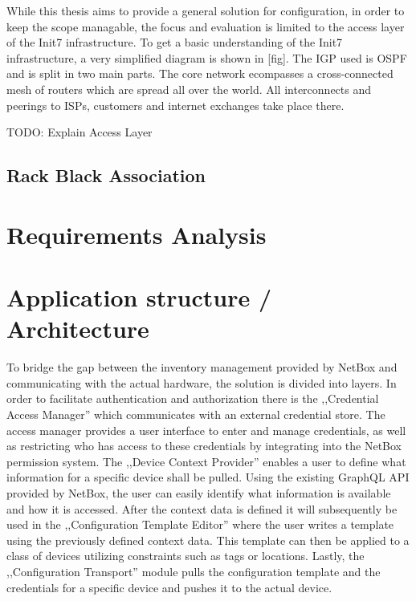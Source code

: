 While this thesis aims to provide a general solution for configuration, in order to keep the scope managable, the focus
and evaluation is limited to the access layer of the Init7 infrastructure.
To get a basic understanding of the Init7 infrastructure, a very simplified diagram is shown in [fig]. The \acrfull{IGP} used is
\acrshort{OSPF} and is split in two main parts. The core network ecompasses a cross-connected mesh of routers which are spread all
over the world. All interconnects and peerings to ISPs, customers and internet exchanges take place there. 

TODO: Explain Access Layer

\subsection{Rack Black Association}



\section{Requirements Analysis}

\section{Application structure / Architecture}

To bridge the gap between the inventory management provided by NetBox and communicating with the actual hardware,
the solution is divided into layers.
In order to facilitate authentication and authorization there is the ,,Credential Access Manager'' which communicates
with an external credential store. The access manager provides a user interface to enter and manage credentials, as well
as restricting who has access to these credentials by integrating into the NetBox permission system.
The ,,Device Context Provider'' enables a user to define what information for a specific device shall be pulled.
Using the existing GraphQL API provided by NetBox, the user can easily identify what information is available and how it is
accessed. After the context data is defined it will subsequently be used in the ,,Configuration Template Editor''
where the user writes a template using the previously defined context data. This template can then be applied to
a class of devices utilizing constraints such as tags or locations.
Lastly, the ,,Configuration Transport'' module pulls the configuration template and the credentials for a specific device
and pushes it to the actual device.

